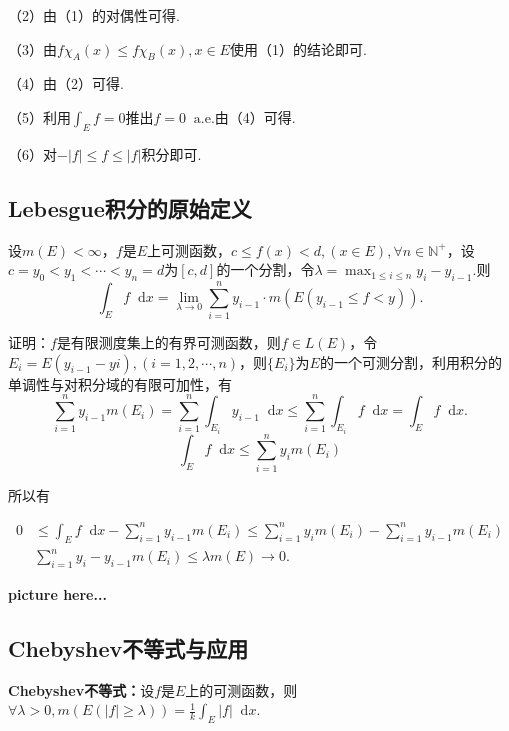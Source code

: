 \documentclass[bwprint, withoutpreface]{cumcmthesis}
\newcommand*{\dif}{\mathop{}\!\mathrm{d}}
\begin{document}
（2）由（1）的对偶性可得.

（3）由$f \chi_A(x) \leqslant f \chi_B(x), x \in E$使用（1）的结论即可.

（4）由（2）可得.

（5）利用$\int_E f = 0$推出$f = 0 \mathop{} \! \mathrm{a.e.}$由（4）可得.

（6）对$-|f| \leqslant f \leqslant |f|$积分即可.

\subsection{Lebesgue积分的原始定义}
设$m(E) < \infty$，$f$是$E$上可测函数，$c \leqslant f(x) < d,(x \in E), \forall n \in \mathbb{N}^+$，设$c = y_0 < y_1 < \cdots < y_n = d$为$[c, d]$的一个分割，令$\lambda = \max_{1 \leqslant i \leqslant n}{y_i - y_{i - 1}}$.则
\begin{equation*}
	\int_E f \dif x = \lim_{\lambda \to 0}{\sum_{i = 1}^{n}{y_{i - 1} \cdot m(E(y_{i - 1} \leqslant f < y))}}.
\end{equation*}

证明：$f$是有限测度集上的有界可测函数，则$f \in L(E)$，令$E_i = E(y_{i - 1} - y{i}), (i = 1, 2, \cdots, n)$，则$\{E_i\}$为$E$的一个可测分割，利用积分的单调性与对积分域的有限可加性，有
\begin{equation*}
	\sum_{i = 1}^{n}{y_{i - 1}} m(E_i) = \sum_{i = 1}^{n}{\int_{E_i} y_{i - 1} \dif x} \leqslant \sum_{i = 1}^{n}{\int_{E_i} f \dif x} = \int_E f \dif x.
\end{equation*}
\begin{equation*}
	\int_E f \dif x \leqslant \sum_{i = 1}^{n}{y_i m(E_i)}
\end{equation*}

所以有

\begin{align*}
	 0 & \leqslant \int_E f \dif x - \sum_{i = 1}^{n}{y_{i - 1}m(E_i)} \leqslant \sum_{i = 1}^{n}{y_i m(E_i)} - \sum_{i = 1}^{n}{y_{i - 1} m(E_i)} \\ 
	   & \sum_{i = 1}^{n}{y_i - y_{i - 1}} m(E_i) \leqslant \lambda m(E) \to 0.
\end{align*}

\textbf{picture here...}

\subsection{Chebyshev不等式与应用}
\indent \textbf{Chebyshev不等式：}设$f$是$E$上的可测函数，则$\forall \lambda > 0, m(E(|f| \geqslant \lambda)) = \frac{1}{k} \int_E |f| \dif x$.
\end{document}

